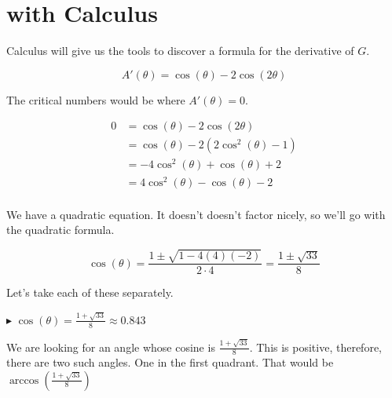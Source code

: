 \documentclass{ximera}
\begin{document}
\section{with Calculus}

Calculus will give us the tools to discover a formula for the derivative of $G$.


\[   A'(\theta) = \cos(\theta)-2 \cos(2\theta)    \]


The critical numbers would be where $A'(\theta) = 0$.



\begin{align*}
0    & = \cos(\theta)-2 \cos(2\theta)   \\
     & = \cos(\theta) - 2 (2 \cos^2(\theta) - 1)    \\
     & = -4 \cos^2(\theta) + \cos(\theta) + 2   \\
     & = 4 \cos^2(\theta) - \cos(\theta) - 2   \\
\end{align*}


We have a quadratic equation.  It doesn't doesn't factor nicely, so we'll go with the quadratic formula.



\[   \cos(\theta) = \frac{1 \pm \sqrt{1 - 4 (4)(-2)}}{2 \cdot 4}  = \frac{1 \pm \sqrt{33}}{8}        \]




Let's take each of these separately.



$\blacktriangleright$  $\cos(\theta) = \frac{1 + \sqrt{33}}{8}   \approx  0.843$


We are looking for an angle whose cosine is $\frac{1 + \sqrt{33}}{8}$.  This is positive, therefore, there are two such angles. One in the first quadrant.  That would be $\arccos\left(\frac{1 + \sqrt{33}}{8}\right)$
\end{document}

